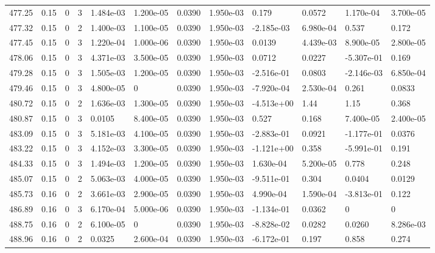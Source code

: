\documentclass[preview]{standalone}
\begin{document}
{{{{{{{{{{{{{{{\begin{tabular}{L{1.2cm}C{1.2cm} C{0.3cm}C{0.5cm} C{1.4cm}C{1.4cm} C{1.4cm}C{1.4cm} C{1.6cm}C{1.6cm} C{1.6cm}C{1.6cm}}
  477.25  &  0.15  & 0     &  3 &  1.484e-03  & 1.200e-05  &  0.0390&   1.950e-03& 0.179 & 0.0572   &  1.170e-04 & 3.700e-05  \\ 
  477.32  &  0.15  & 0     &  2 &  1.400e-03  & 1.100e-05  &  0.0390&   1.950e-03& -2.185e-03 & 6.980e-04   &  0.537 & 0.172  \\ 
  477.45  &  0.15  & 0     &  3 &  1.220e-04  & 1.000e-06  &  0.0390&   1.950e-03& 0.0139 & 4.439e-03   &  8.900e-05 & 2.800e-05  \\ 
  478.06  &  0.15  & 0     &  3 &  4.371e-03  & 3.500e-05  &  0.0390&   1.950e-03& 0.0712 & 0.0227   &  -5.307e-01 & 0.169  \\ 
  479.28  &  0.15  & 0     &  3 &  1.505e-03  & 1.200e-05  &  0.0390&   1.950e-03& -2.516e-01 & 0.0803   &  -2.146e-03 & 6.850e-04  \\ 
  479.46  &  0.15  & 0     &  3 &  4.800e-05  & 0  &  0.0390&   1.950e-03& -7.920e-04 & 2.530e-04   &  0.261 & 0.0833  \\ 
  480.72  &  0.15  & 0     &  2 &  1.636e-03  & 1.300e-05  &  0.0390&   1.950e-03& -4.513e+00 & 1.44   &  1.15 & 0.368  \\ 
  480.87  &  0.15  & 0     &  3 &  0.0105  & 8.400e-05  &  0.0390&   1.950e-03& 0.527 & 0.168   &  7.400e-05 & 2.400e-05  \\ 
  483.09  &  0.15  & 0     &  3 &  5.181e-03  & 4.100e-05  &  0.0390&   1.950e-03& -2.883e-01 & 0.0921   &  -1.177e-01 & 0.0376  \\ 
  483.22  &  0.15  & 0     &  3 &  4.152e-03  & 3.300e-05  &  0.0390&   1.950e-03& -1.121e+00 & 0.358   &  -5.991e-01 & 0.191  \\ 
  484.33  &  0.15  & 0     &  3 &  1.494e-03  & 1.200e-05  &  0.0390&   1.950e-03& 1.630e-04 & 5.200e-05   &  0.778 & 0.248  \\ 
  485.07  &  0.15  & 0     &  2 &  5.063e-03  & 4.000e-05  &  0.0390&   1.950e-03& -9.511e-01 & 0.304   &  0.0404 & 0.0129  \\ 
  485.73  &  0.16  & 0     &  2 &  3.661e-03  & 2.900e-05  &  0.0390&   1.950e-03& 4.990e-04 & 1.590e-04   &  -3.813e-01 & 0.122  \\ 
  486.89  &  0.16  & 0     &  3 &  6.170e-04  & 5.000e-06  &  0.0390&   1.950e-03& -1.134e-01 & 0.0362   &  0 & 0  \\ 
  488.75  &  0.16  & 0     &  2 &  6.100e-05  & 0  &  0.0390&   1.950e-03& -8.828e-02 & 0.0282   &  0.0260 & 8.286e-03  \\ 
  488.96  &  0.16  & 0     &  2 &  0.0325  & 2.600e-04  &  0.0390&   1.950e-03& -6.172e-01 & 0.197   &  0.858 & 0.274  \\ 

\end{tabular}}}}}}}}}}}}}}}}
\end{document}

